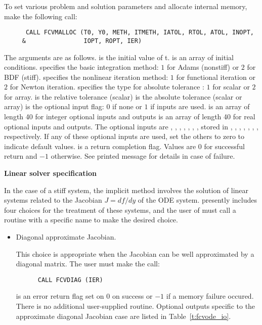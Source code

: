 \begin{Steps}
  To set various problem and solution parameters and allocate
  internal memory, make the following call:
\begin{verbatim}
      CALL FCVMALLOC (T0, Y0, METH, ITMETH, IATOL, RTOL, ATOL, INOPT,
     &                IOPT, ROPT, IER)
\end{verbatim}
  The arguments are as follows.
   is the initial value of t.
   is an array of initial conditions.
   specifies the  basic integration method: 
       $1$ for Adams (nonstiff) or $2$ for BDF (stiff).
   specifies the nonlinear iteration method: 
       $1$ for functional iteration or $2$ for Newton iteration.
   specifies the type for absolute tolerance :
       $1$ for scalar or $2$ for array.
   is the relative tolerance (scalar)
   is the absolute tolerance (scalar or array)
   is the optional input flag: $0$ if none or $1$ if inputs are used.
   is an array of length 40 for integer optional inputs and outputs
   is an array of length 40 for real optional inputs and outputs.
  The optional inputs are , , , , , 
  , , stored in , , , 
  , , , , respectively.  
  If any of these optional inputs are used, set the others to zero to indicate 
  default values. 
   is a return completion flag.  Values are $0$ for successful return and 
      $-1$ otherwise. See printed message for details in case of failure.

\item {\bf Linear solver specification}
  
  In the case of a stiff system, the implicit  method involves the solution
  of linear systems related to the Jacobian $J = df/dy$ of the ODE system.
  {\cvode} presently includes four choices for the treatment of these systems,
  and the user of {\fcvode} must call a routine with a specific name to make the
  desired choice.

  \begin{itemize}

  \item {\s} Diagonal approximate Jacobian.

    This choice is appropriate when the Jacobian can be well approximated by
    a diagonal matrix.  The user must make the call:
\begin{verbatim}
      CALL FCVDIAG (IER)
\end{verbatim}
     is an error return flag set on $0$ on success or $-1$ if a memory 
    failure occured.
    There is no additional user-supplied routine.  Optional outputs specific
    to the approximate diagonal Jacobian case are listed  in Table~\ref{t:fcvode_io}.


\end{itemize}
\end{Steps}
